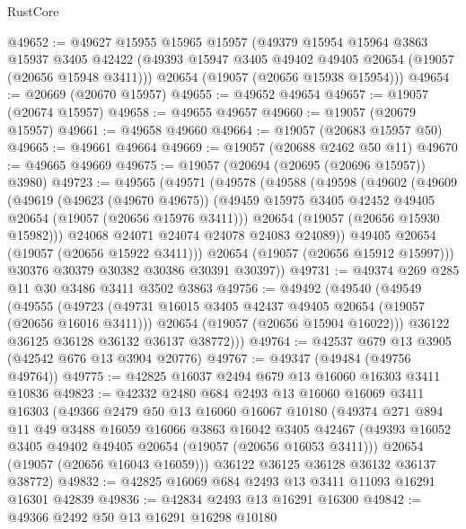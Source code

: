 \begin{lexlean}{RustCore}
\begin{coremodule}
@49652 := @49627
    @15955
    @15965
    @15957
    (@49379
      @15954
      @15964
      @3863
      @15937
      @3405
      @42422
      (@49393 @15947 @3405 @49402 @49405 @20654 (@19057 (@20656 @15948 @3411)))
      @20654
      (@19057 (@20656 @15938 @15954)))
@49654 := @20669 (@20670 @15957)
@49655 := @49652 @49654
@49657 := @19057 (@20674 @15957)
@49658 := @49655 @49657
@49660 := @19057 (@20679 @15957)
@49661 := @49658 @49660
@49664 := @19057 (@20683 @15957 @50)
@49665 := @49661 @49664
@49669 := @19057 (@20688 @2462 @50 @11)
@49670 := @49665 @49669
@49675 := @19057 (@20694 (@20695 (@20696 @15957)) @3980)
@49723 := @49565
    (@49571
      (@49578
        (@49588
          (@49598
            (@49602
              (@49609
                (@49619
                  (@49623 (@49670 @49675))
                  (@49459 @15975 @3405 @42452 @49405 @20654 (@19057 (@20656 @15976 @3411)))
                  @20654
                  (@19057 (@20656 @15930 @15982)))
                @24068
                @24071
                @24074
                @24078
                @24083
                @24089))
            @49405
            @20654
            (@19057 (@20656 @15922 @3411)))
          @20654
          (@19057 (@20656 @15912 @15997)))
        @30376
        @30379
        @30382
        @30386
        @30391
        @30397))
@49731 := @49374 @269 @285 @11 @30 @3486 @3411 @3502 @3863
@49756 := @49492
    (@49540
      (@49549
        (@49555
          (@49723
            (@49731 @16015 @3405 @42437 @49405 @20654 (@19057 (@20656 @16016 @3411)))
            @20654
            (@19057 (@20656 @15904 @16022)))
          @36122
          @36125
          @36128
          @36132
          @36137
          @38772)))
@49764 := @42537 @679 @13 @3905 (@42542 @676 @13 @3904 @20776)
@49767 := @49347 (@49484 (@49756 @49764))
@49775 := @42825 @16037 @2494 @679 @13 @16060 @16303 @3411 @10836
@49823 := @42332
    @2480
    @684
    @2493
    @13
    @16060
    @16069
    @3411
    @16303
    (@49366
      @2479
      @50
      @13
      @16060
      @16067
      @10180
      (@49374
        @271
        @894
        @11
        @49
        @3488
        @16059
        @16066
        @3863
        @16042
        @3405
        @42467
        (@49393 @16052 @3405 @49402 @49405 @20654 (@19057 (@20656 @16053 @3411)))
        @20654
        (@19057 (@20656 @16043 @16059)))
      @36122
      @36125
      @36128
      @36132
      @36137
      @38772)
@49832 := @42825 @16069 @684 @2493 @13 @3411 @11093 @16291 @16301 @42839
@49836 := @42834 @2493 @13 @16291 @16300
@49842 := @49366 @2492 @50 @13 @16291 @16298 @10180

\end{coremodule}
\end{lexlean}
